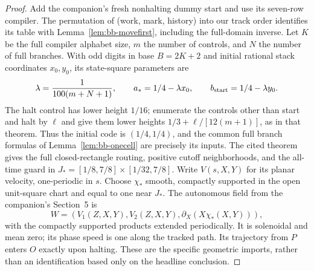 \begin{proof}\label{bc:input-offset-event-proof}
Add the companion's fresh nonhalting dummy start and use its seven-row
compiler. The permutation of (work, mark, history) into our track order
identifies its table with Lemma~\ref{lem:bb-movefirst}, including the full-domain
inverse. Let $K$ be the full compiler alphabet size, $m$ the number of
controls, and $N$ the number of full branches. With odd digits in base
$B=2K+2$ and initial rational stack coordinates $x_0,y_0$, its state-square
parameters are
\begin{equation}\label{bc:input-offset-state-squares}
 \lambda=\frac1{100(m+N+1)},\qquad
 a_*=1/4-\lambda x_0,\qquad b_{\rm start}=1/4-\lambda y_0.
\end{equation}
The halt control has lower height $1/16$; enumerate the controls other
than start and halt by $\ell$ and give them lower heights
$1/3+\ell/[12(m+1)]$, as in that theorem. Thus the
initial code is $(1/4,1/4)$, and the common full branch formulas of
Lemma~\ref{lem:bb-onecell} are precisely its inputs. The cited theorem gives
the full closed-rectangle routing, positive cutoff neighborhoods, and the
all-time guard in $J_*=[1/8,7/8]\times[1/32,7/8]$. Write $V(s,X,Y)$ for
its planar velocity, one-periodic in $s$. Choose $\chi_*$ smooth,
compactly supported in the open unit-square chart and equal to one near
$J_*$. The autonomous field
from the companion's Section~5 is
\begin{equation}\label{bc:input-offset-W}
 W=(V_1(Z,X,Y),V_2(Z,X,Y),\partial_X(X\chi_*(X,Y))),
\end{equation}
with the compactly supported products extended periodically. It is
solenoidal and mean zero; its phase
speed is one along the tracked path. Its trajectory from $P$ enters $O$
exactly upon halting. These are the specific geometric imports, rather
than an identification based only on the headline conclusion.


\end{proof}
